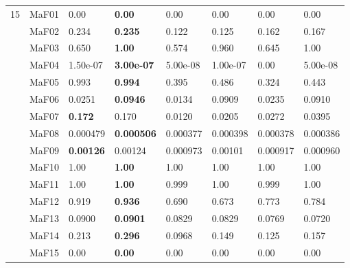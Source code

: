 \documentclass[]{article}
\begin{document}
\begin{landscape}
\begin{table}
\begin{footnotesize}
\begin{tabular}{|l|l|l|l|l|l|l|l|}
\multirow{15}{*}{15} & MaF01 & \cellcolor{gray95} 0.00 & \cellcolor{gray95} {\bf 0.00} & \cellcolor{gray95} 0.00 & \cellcolor{gray95} 0.00 & \cellcolor{gray95} 0.00 & \cellcolor{gray95} 0.00\\
 & MaF02 & \cellcolor{gray95} 0.234 & \cellcolor{gray95} {\bf 0.235} & 0.122 & 0.125 & 0.162 & 0.167\\
 & MaF03 & 0.650 & \cellcolor{gray95} {\bf 1.00} & 0.574 & 0.960 & 0.645 & 1.00\\
 & MaF04 & \cellcolor{gray95} 1.50e-07 & \cellcolor{gray95} {\bf 3.00e-07} & \cellcolor{gray95} 5.00e-08 & \cellcolor{gray95} 1.00e-07 & \cellcolor{gray95} 0.00 & \cellcolor{gray95} 5.00e-08\\
 & MaF05 & \cellcolor{gray95} 0.993 & \cellcolor{gray95} {\bf 0.994} & 0.395 & 0.486 & 0.324 & 0.443\\
 & MaF06 & 0.0251 & \cellcolor{gray95} {\bf 0.0946} & 0.0134 & \cellcolor{gray95} 0.0909 & 0.0235 & \cellcolor{gray95} 0.0910\\
 & MaF07 & \cellcolor{gray95} {\bf 0.172} & \cellcolor{gray95} 0.170 & 0.0120 & 0.0205 & 0.0272 & 0.0395\\
 & MaF08 & \cellcolor{gray95} 0.000479 & \cellcolor{gray95} {\bf 0.000506} & 0.000377 & 0.000398 & 0.000378 & 0.000386\\
 & MaF09 & \cellcolor{gray95} {\bf 0.00126} & \cellcolor{gray95} 0.00124 & 0.000973 & 0.00101 & 0.000917 & 0.000960\\
 & MaF10 & \cellcolor{gray95} 1.00 & \cellcolor{gray95} {\bf 1.00} & 1.00 & 1.00 & 1.00 & \cellcolor{gray95} 1.00\\
 & MaF11 & \cellcolor{gray95} 1.00 & \cellcolor{gray95} {\bf 1.00} & 0.999 & \cellcolor{gray95} 1.00 & 0.999 & 1.00\\
 & MaF12 & \cellcolor{gray95} 0.919 & \cellcolor{gray95} {\bf 0.936} & 0.690 & 0.673 & 0.773 & 0.784\\
 & MaF13 & \cellcolor{gray95} 0.0900 & \cellcolor{gray95} {\bf 0.0901} & 0.0829 & 0.0829 & 0.0769 & 0.0720\\
 & MaF14 & \cellcolor{gray95} 0.213 & \cellcolor{gray95} {\bf 0.296} & 0.0968 & 0.149 & 0.125 & 0.157\\
 & MaF15 & \cellcolor{gray95} 0.00 & \cellcolor{gray95} {\bf 0.00} & \cellcolor{gray95} 0.00 & \cellcolor{gray95} 0.00 & \cellcolor{gray95} 0.00 & \cellcolor{gray95} 0.00\\
\hline
\end{tabular}
\end{footnotesize}
\end{table}
\end{landscape}
\end{document}
